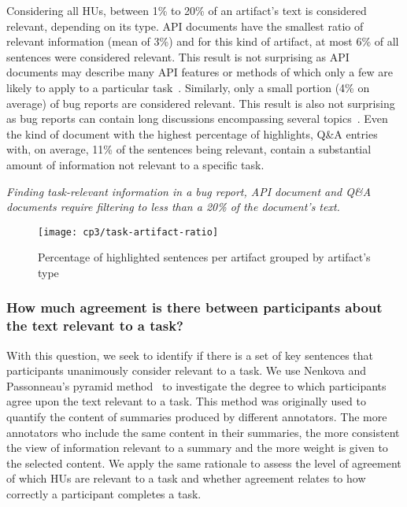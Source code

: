 Considering all HUs, between 1\% to 20\% of an artifact's text is considered relevant, depending on its type.
API documents have the smallest ratio of
relevant information (mean of 3\%) and for this kind of artifact,
at most 6\% of all sentences were considered relevant.
This result is not surprising as API documents may describe many API features or
methods of which only a few are likely to apply to
a particular task~\cite{robillard2011field}.
Similarly, only a small portion (4\% on average) of
bug reports are considered relevant.
This result is also not
surprising as bug reports can contain long discussions encompassing
several topics~\cite{Breu2010, Rastkar2010}.
Even the kind of document with the highest
percentage of highlights, Q\&A entries with, on average, 11\%
of the sentences being relevant,
contain a substantial amount of information not relevant to a
specific task. 







\medskip
\begin{bluequote}
    \textit{Finding task-relevant information in a bug report,
    API document and Q\&A documents require filtering to less than
    a 20\% of the document's text.}
\end{bluequote}



\begin{figure}
    \centering
    \texttt{[image: cp3/task-artifact-ratio]}
    \caption{Percentage of highlighted sentences per artifact grouped by artifact's type}
    \label{fig:task-artifact-ratio}
\end{figure}

\subsubsection{How much agreement is there between participants about the text relevant to a task?}
\label{cp3:agreement}


With this question, we seek to identify if there is a set of key sentences that
participants unanimously consider relevant to a task. 
We use Nenkova and Passonneau's
pyramid method~\cite{Nenkova2004}
to investigate the degree to which participants agree upon
the text relevant to a task. This method was originally used
to quantify the content of summaries produced by different annotators.
The more annotators who include the same content in their summaries,
the more consistent the view of information relevant to a summary and
the more weight is given to the selected content. We apply the same rationale
to assess the level of agreement of which HUs are relevant to a task
and whether agreement relates to how correctly
a participant completes a task.




